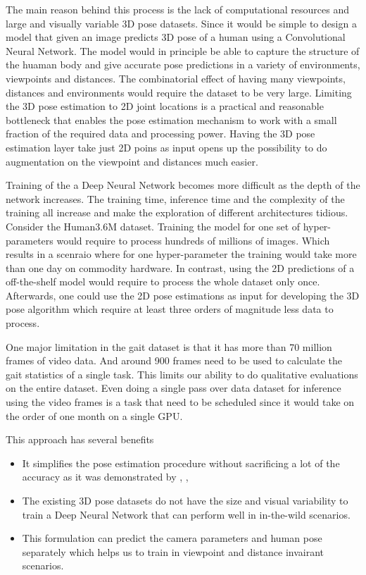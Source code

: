 The main reason behind this process is the lack of computational resources and large and visually variable 3D pose datasets. Since it would be simple to design a model that given an image predicts 3D pose of a human using a Convolutional Neural Network. The model would in principle be able to capture the structure of the huaman body and give accurate pose predictions in a variety of environments, viewpoints and distances. The combinatorial effect of having many viewpoints, distances and environments would require the dataset to be very large. Limiting the 3D pose estimation to 2D joint locations is a practical and reasonable bottleneck that enables the pose estimation mechanism to work with a small fraction of the required data and processing power. Having the 3D pose estimation layer take just 2D poins as input opens up the possibility to do augmentation on the viewpoint and distances much easier. 

Training of the a Deep Neural Network becomes more difficult as the depth of the network increases. The training time, inference time and the complexity of the training all increase and make the exploration of different architectures tidious. 
Consider the Human3.6M dataset. Training the model for one set of hyper-parameters would require to process hundreds of millions of images. Which results in a scenraio where for one hyper-parameter the training would take more than one day on commodity hardware. In contrast, using the 2D predictions of a off-the-shelf model would require to process the whole dataset only once. Afterwards, one could use the 2D pose estimations as input for developing the 3D pose algorithm which require at least three orders of magnitude less data to process.

One major limitation in the gait dataset is that it has more than 70 million frames of video data. And around 900 frames need to be used to calculate the gait statistics of a single task. This limits our ability to do qualitative evaluations on the entire dataset. Even doing a single pass over data dataset for inference using the video frames is a task that need to be scheduled since it would take on the order of one month on a single GPU. 

This approach has several benefits
\begin{itemize}
    \item It simplifies the pose estimation procedure without sacrificing a lot of the accuracy as it was demonstrated by \parencite{martinez2017simple}, \parencite{sun2017compositional}, \parencite{hossain2017exploiting}
    \item The existing 3D pose datasets do not have the size and visual variability to train a Deep Neural Network that can perform well in in-the-wild scenarios.
    \item This formulation can predict the camera parameters and human pose separately which helps us to train in viewpoint and distance invairant scenarios.
\end{itemize}

